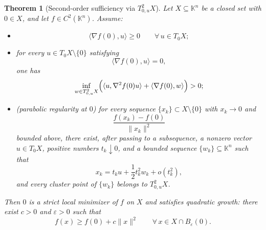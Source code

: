 \documentclass[10pt,a4paper]{amsart}
\newtheorem{theorem}{Theorem}
\begin{document}
\begin{theorem}[Second-order sufficiency via $T^2_{0,u}X$]
\label{thm:SOSC}
Let $X\subseteq\mathbb K^n$ be a closed set with $0\in X$, and let
$f\in C^2(\mathbb K^n)$. Assume:
\begin{itemize}
\item[(i)] 
\[
\langle \nabla f(0),u\rangle \ge 0
\qquad \forall\,u\in T_0X;
\]

\item[(ii)] for every $u\in T_0X\setminus\{0\}$ satisfying
\[
\langle \nabla f(0),u\rangle =0,
\]
one has
\begin{equation}\label{eq:SOSC-assump}
\inf_{w\in T^2_{0,u}X}
\Bigl(
\langle u,\nabla^2 f(0)u\rangle
+
\langle \nabla f(0),w\rangle
\Bigr)>0;
\end{equation}

\item[(iii)] \emph{(parabolic regularity at $0$)} for every sequence
$\{x_k\}\subset X\setminus\{0\}$ with $x_k\to 0$ and
\[
\frac{f(x_k)-f(0)}{\|x_k\|^2}
\]
bounded above, there exist, after passing to a subsequence,
a nonzero vector $u\in T_0X$, positive numbers $t_k\downarrow 0$, and a bounded
sequence $\{w_k\}\subseteq\mathbb K^n$ such that
\begin{equation}\label{eq:parabolic-expansion}
x_k=t_k u+\frac12 t_k^2w_k+o(t_k^2),
\end{equation}
and every cluster point of $\{w_k\}$ belongs to $T^2_{0,u}X$.
\end{itemize}
Then $0$ is a strict local minimizer of $f$ on $X$ and satisfies quadratic
growth: there exist $c>0$ and $\varepsilon>0$ such that
\[
f(x)\ge f(0)+c\|x\|^2
\qquad \forall\,x\in X\cap B_\varepsilon(0).
\]
\end{theorem}
\end{document}
